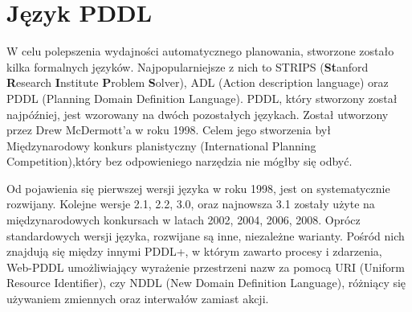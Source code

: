 \section{Język PDDL}
W celu polepszenia wydajności automatycznego planowania, stworzone zostało kilka formalnych języków. Najpopularniejsze z nich to STRIPS (\textbf{St}anford \textbf{R}esearch \textbf{I}nstitute \textbf{P}roblem \textbf{S}olver), ADL (Action description language) oraz PDDL (Planning Domain Definition Language). PDDL, który stworzony został najpóźniej, jest wzorowany na dwóch pozostałych językach. Został utworzony przez Drew McDermott'a w roku 1998. Celem jego stworzenia był Międzynarodowy konkurs planistyczny (International Planning Competition),który bez odpowieniego narzędzia nie mógłby się odbyć.

Od pojawienia się pierwszej wersji języka w roku 1998, jest on systematycznie rozwijany. Kolejne wersje 2.1, 2.2, 3.0, oraz najnowsza 3.1 zostały użyte na międzynarodowych konkursach w latach 2002, 2004, 2006, 2008. Oprócz standardowych wersji języka, rozwijane są inne, niezależne warianty. Pośród nich znajdują się między innymi PDDL+, w którym zawarto procesy i zdarzenia, Web-PDDL umożliwiający wyrażenie przestrzeni nazw za pomocą URI (Uniform Resource Identifier), czy NDDL (New Domain Definition Language), różniący się używaniem zmiennych oraz interwałów zamiast akcji.

